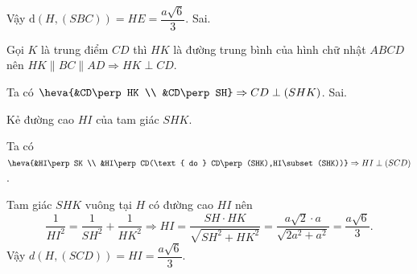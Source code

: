 \begin{ex}
{\begin{itemchoice}
			Vậy $\mathrm{d}(H,(SBC))=HE=\dfrac{a\sqrt{6}}{3}$.
			\itemch Sai.
			
				Gọi $K$ là trung điểm $CD$ thì $HK$ là đường trung bình của hình chữ nhật $ABCD$ nên $HK\parallel BC\parallel AD\Rightarrow HK\perp CD$.
			
			Ta có $\heva{&CD\perp HK \\ &CD\perp SH} \Rightarrow CD\perp (SHK)$.
			\itemch Sai.
			
			
			Kẻ đường cao $HI$ của tam giác $SHK$.
			
			Ta có $\heva{&HI\perp SK \\ &HI\perp CD(\text{ do } CD\perp (SHK),HI\subset (SHK))} \Rightarrow HI\perp (SCD)$.
			
			Tam giác $SHK$ vuông tại $H$ có đường cao $HI$ nên
			\[\dfrac{1}{HI^2}=\dfrac{1}{SH^2}+\dfrac{1}{HK^2} \Rightarrow HI=\dfrac{SH\cdot HK}{\sqrt{SH^2+HK^2}}=\dfrac{a\sqrt{2} \cdot a}{\sqrt{2a^2+a^2}}=\dfrac{a\sqrt{6}}{3}.\]
			Vậy $d(H,(SCD))=HI=\dfrac{a\sqrt{6}}{3}$.
		\end{itemchoice}
	}
\end{ex}

